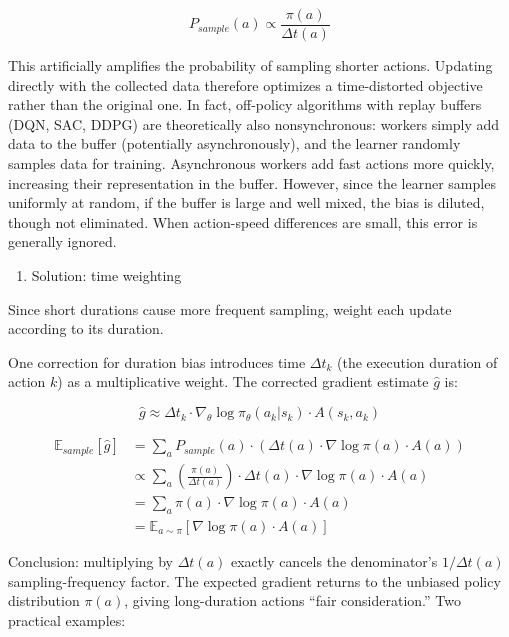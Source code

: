 \[
P_{sample}(a)\propto \frac{\pi(a)}{\Delta t(a)}
\]

This artificially amplifies the probability of sampling shorter actions. Updating directly with the collected data therefore optimizes a time-distorted objective rather than the original one.
In fact, off-policy algorithms with replay buffers (DQN, SAC, DDPG) are theoretically also nonsynchronous: workers simply add data to the buffer (potentially asynchronously), and the learner randomly samples data for training. Asynchronous workers add fast actions more quickly, increasing their representation in the buffer. However, since the learner samples uniformly at random, if the buffer is large and well mixed, the bias is diluted, though not eliminated. When action-speed differences are small, this error is generally ignored.

\begin{enumerate}
\def\labelenumi{\arabic{enumi}.}
\setcounter{enumi}{1}
\tightlist
\item
  Solution: time weighting
\end{enumerate}

Since short durations cause more frequent sampling, weight each update according to its duration.

One correction for duration bias introduces time \(\Delta t_k\) (the execution duration of action \(k\)) as a multiplicative weight. The corrected gradient estimate \(\hat{g}\) is:

\[
\hat{g}\approx \Delta t_k\cdot \nabla_\theta\log\pi_\theta(a_k|s_k)\cdot A(s_k,a_k)
\]

\[
\begin{aligned}
\mathbb{E}_{sample}[\hat{g}]
&= \sum_a P_{sample}(a)\cdot\left(\Delta t(a)\cdot\nabla\log\pi(a)\cdot A(a)\right)\\
&\propto \sum_a \left(\frac{\pi(a)}{\Delta t(a)}\right)\cdot\Delta t(a)\cdot\nabla\log\pi(a)\cdot A(a)\\
&= \sum_a \pi(a)\cdot\nabla\log\pi(a)\cdot A(a)\\
&= \mathbb{E}_{a\sim\pi}\left[\nabla\log\pi(a)\cdot A(a)\right]
\end{aligned}
\]

Conclusion: multiplying by \(\Delta t(a)\) exactly cancels the denominator's \(1/\Delta t(a)\) sampling-frequency factor. The expected gradient returns to the unbiased policy distribution \(\pi(a)\), giving long-duration actions ``fair consideration.''
Two practical examples:

